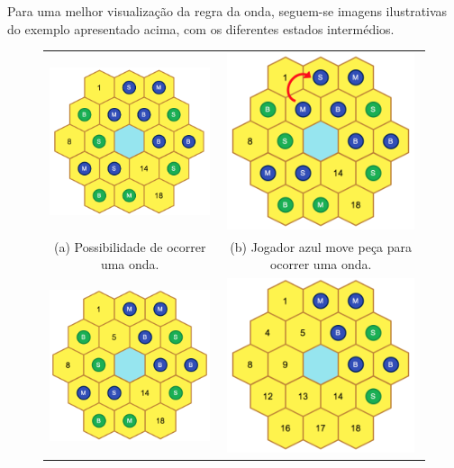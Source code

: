 \documentclass[a4paper]{article}
\begin{document}
Para uma melhor visualização da regra da onda, seguem-se imagens ilustrativas do exemplo apresentado acima, com os diferentes estados intermédios.

\begin{figure}
\begin{tabular}{cc}
  \includegraphics[width=55mm]{img/wave1.png} &   \includegraphics[width=55mm]{img/wave2.png} \\
(a) Possibilidade de ocorrer uma onda. & (b) Jogador azul move peça para  ocorrer uma onda. \\[6pt]
 \includegraphics[width=55mm]{img/wave3.png} &   \includegraphics[width=55mm]{img/wave4.png} \\

\end{tabular}
\end{figure}
\end{document}
